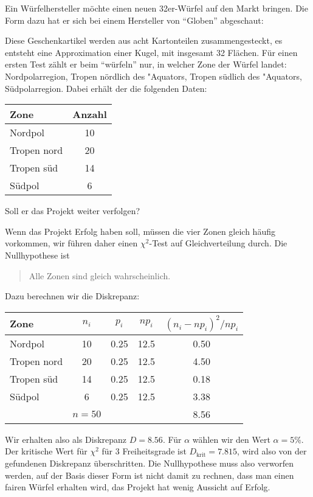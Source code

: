 Ein Würfelhersteller möchte einen neuen 32er-Würfel auf den Markt
bringen.
Die Form dazu hat er sich bei einem Hersteller von ``Globen'' abgeschaut: 
\begin{center}
\end{center}
Diese Geschenkartikel werden aus acht Kartonteilen zusammengesteckt, es
entsteht eine Approximation einer Kugel, mit insgesamt 32 Flächen.
Für einen ersten Test zählt er beim ``würfeln'' nur, in welcher Zone
der Würfel landet: Nordpolarregion, Tropen nördlich des "Aquators,
Tropen südlich des "Aquators, Südpolarregion.
Dabei erhält der die folgenden Daten:
\begin{center}
\begin{tabular}{|l|c|}
\hline
Zone       &Anzahl\\
\hline
Nordpol    & 10\\
Tropen nord& 20\\
Tropen süd& 14\\
Südpol    & 6\\
\hline
\end{tabular}
\end{center}
Soll er das Projekt weiter verfolgen?


\begin{loesung}
Wenn das Projekt Erfolg haben soll, müssen die vier Zonen gleich häufig
vorkommen, wir führen daher einen $\chi^2$-Test auf Gleichverteilung
durch.
Die Nullhypothese ist
\begin{quote}
Alle Zonen sind gleich wahrscheinlich.
\end{quote}
Dazu berechnen wir die Diskrepanz:
\begin{center}
\begin{tabular}{|l|c|c|c|c|}
\hline
Zone       & $n_i$ & $p_i$ & $np_i$ & $(n_i-np_i)^2/np_i$ \\
\hline
Nordpol    &  10   & 0.25  & 12.5   & 0.50 \\
Tropen nord&  20   & 0.25  & 12.5   & 4.50 \\
Tropen süd&  14   & 0.25  & 12.5   & 0.18 \\
Südpol    &   6   & 0.25  & 12.5   & 3.38 \\
\hline
           &$n=50$ &       &        & 8.56 \\
\hline
\end{tabular}
\end{center}
Wir erhalten also als Diskrepanz $D=8.56$.
Für $\alpha$ wählen wir den Wert $\alpha=5\%$.
Der kritische Wert für $\chi^2$ für 3 Freiheitsgrade ist 
$D_{\text{krit}}=7.815$, wird also von der gefundenen Diskrepanz
überschritten.
Die Nullhypothese muss also verworfen werden, auf der Basis dieser
Form ist nicht damit zu rechnen, dass man einen fairen Würfel
erhalten wird, das Projekt hat wenig Aussicht auf Erfolg.
\end{loesung}

